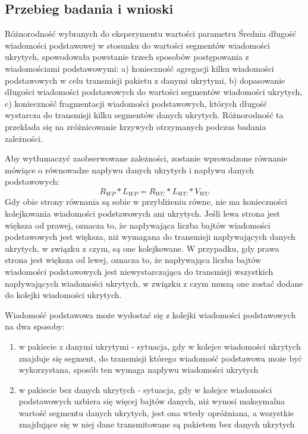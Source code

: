 \documentclass[a4paper, twoside, 12pt]{report}
\begin{document}
        \subsection{Przebieg badania i wnioski}
            Różnorodność wybranych do eksperymentu wartości parametru Średnia długość
            wiadomości podstawowej w stosunku do wartości segmentów wiadomości ukrytych,
            spowodowała powstanie trzech sposobów postępowania z wiadomościami podstawowymi:
            a) konieczność agregacji kilku wiadomości podstawowych w celu transmisji pakietu z danymi ukrytymi,
            b) dopasowanie długości wiadomości podstawowych do wartości segmentów wiadomości ukrytych,
            c) konieczność fragmentacji wiadomości podstawowych, których długość wystarcza
            do transmisji kilku segmentów danych ukrytych. Różnorodność ta przekłada
            się na zróżnicowanie krzywych otrzymanych podczas badania zależności.

            Aby wytłumaczyć zaobserwowane zależności, zostanie wprowadzone równanie
            mówiące o równowadze napływu danych ukrytych i napływu danych podstawowych:
            \begin{equation} \label{ROWNANIEROWNOWAGI}
            R_{WP} * L_{WP} = R_{WU} * L_{WU} * V_{WU}
            \end{equation}
            Gdy obie strony równania są sobie w przybliżeniu równe, nie ma konieczności
            kolejkowania wiadomości podstawowych ani ukrytych. Jeśli lewa strona jest
            większa od prawej, oznacza to, że napływająca liczba bajtów wiadomości podstawowych
            jest większa, niż wymagana do transmisji napływających danych ukrytych,
            w związku z czym, są one kolejkowane. W przypadku, gdy prawa strona jest
            większa od lewej, oznacza to, że napływająca liczba bajtów wiadomości
            podstawowych jest niewystarczająca do transmisji wszystkich napływających
            wiadomości ukrytych, w związku z czym muszą one zostać dodane do kolejki
            wiadomości ukrytych.

            Wiadomość podstawowa może wydostać się z kolejki wiadomości podstawowych
            na dwa sposoby:
            \begin{enumerate}
                \item w pakiecie z danymi ukrytymi - sytuacja, gdy w kolejce
                    wiadomości ukrytych znajduje się segment, do transmisji którego
                    wiadomość podstawowa może być wykorzystana, sposób ten wymaga
                    napływu wiadomości ukrytych
                \item w pakiecie bez danych ukrytych - sytuacja, gdy w kolejce wiadomości
                    podstawowych uzbiera się więcej bajtów danych, niż wynosi
                    maksymalna wartość segmentu danych ukrytych, jest ona wtedy
                    opróżniana, a wszystkie znajdujące się w niej dane transmitowane
                    są pakietem bez danych ukrytych
            \end{enumerate}
\end{document}
